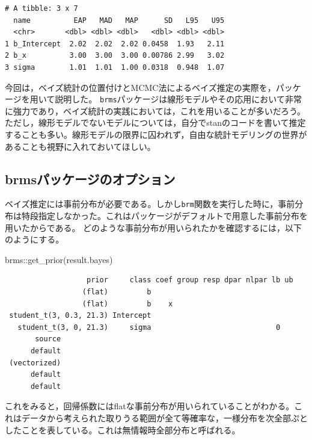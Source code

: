 \documentclass[
  a4paper,
]{ltjsbook}
\newenvironment{Shaded}{\begin{snugshade}}{\end{snugshade}}
\newcommand{\FunctionTok}[1]{\textcolor[rgb]{0.28,0.35,0.67}{#1}}
\newcommand{\NormalTok}[1]{\textcolor[rgb]{0.00,0.23,0.31}{#1}}
\newcommand{\SpecialCharTok}[1]{\textcolor[rgb]{0.37,0.37,0.37}{#1}}
\begin{document}
\begin{verbatim}
# A tibble: 3 x 7
  name          EAP   MAD   MAP      SD   L95   U95
  <chr>       <dbl> <dbl> <dbl>   <dbl> <dbl> <dbl>
1 b_Intercept  2.02  2.02  2.02 0.0458  1.93   2.11
2 b_x          3.00  3.00  3.00 0.00786 2.99   3.02
3 sigma        1.01  1.01  1.00 0.0318  0.948  1.07
\end{verbatim}

今回は，ベイズ統計の位置付けとMCMC法によるベイズ推定の実際を，パッケージを用いて説明した。
\texttt{brms}パッケージは線形モデルやその応用において非常に強力であり，ベイズ統計の実践においては，これを用いることが多いだろう。ただし，線形モデルでないモデルについては，自分でstanのコードを書いて推定することも多い。線形モデルの限界に囚われず，自由な統計モデリングの世界があることも視野に入れておいてほしい。

\subsection{brmsパッケージのオプション}\label{brmsux30d1ux30c3ux30b1ux30fcux30b8ux306eux30aaux30d7ux30b7ux30e7ux30f3}

ベイズ推定には事前分布が必要である。しかし\texttt{brm}関数を実行した時に，事前分布は特段指定しなかった。これはパッケージがデフォルトで用意した事前分布を用いたからである。
どのような事前分布が用いられたかを確認するには，以下のようにする。

\begin{Shaded}
\begin{Highlighting}[]
\NormalTok{brms}\SpecialCharTok{::}\FunctionTok{get\_prior}\NormalTok{(result.bayes)}
\end{Highlighting}
\end{Shaded}

\begin{verbatim}
                   prior     class coef group resp dpar nlpar lb ub
                  (flat)         b                                 
                  (flat)         b    x                            
 student_t(3, 0.3, 21.3) Intercept                                 
   student_t(3, 0, 21.3)     sigma                             0   
       source
      default
 (vectorized)
      default
      default
\end{verbatim}

これをみると，回帰係数にはflatな事前分布が用いられていることがわかる。これはデータから考えられた取りうる範囲が全て等確率な，一様分布を次全部ぷとしたことを表している。これは無情報時全部分布と呼ばれる。
\end{document}
